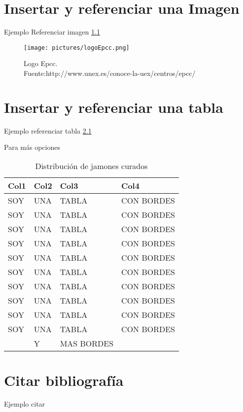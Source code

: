 \documentclass[12pt,a4paper,twoside]{article} %
\begin{document}
\chapter{\textbf{Insertar y referenciar una Imagen\\}}
Ejemplo Referenciar imagen \ref{fig:logoEpcc}
\begin{figure}[H]
\centering
\texttt{[image: pictures/logoEpcc.png]}
\caption[Logo Epcc]{Logo Epcc.\\Fuente:http://www.unex.es/conoce-la-uex/centros/epcc/}
\label{fig:logoEpcc}
\end{figure}

\pagebreak
{}
\chapter{\textbf{Insertar y referenciar una tabla\\}}
Ejemplo referenciar tabla \ref{tab:tablaEj}

Para más opciones \cite{tables} \par
\begin{table}[H]
\centering
\begin{tabular}{|l|l|l|l|}
\hline
 Col1 & Col2 & Col3  & Col4 \\ \hline
SOY &  UNA & TABLA & CON BORDES \\
SOY &  UNA & TABLA & CON BORDES \\
SOY &  UNA & TABLA & CON BORDES \\
SOY &  UNA & TABLA & CON BORDES \\
SOY &  UNA & TABLA & CON BORDES \\
SOY &  UNA & TABLA & CON BORDES \\
SOY &  UNA & TABLA & CON BORDES \\
SOY &  UNA & TABLA & CON BORDES \\
SOY &  UNA & TABLA & CON BORDES \\
SOY &  UNA & TABLA & CON BORDES \\ \hline
 & Y & MAS BORDES & \\
\hline
\end{tabular}
\caption[table]{Distribución de jamones curados}
\label{tab:tablaEj}
\end{table} 


\chapter{\textbf{Citar bibliografía\\}}

Ejemplo citar \cite{haut2016cloud}

\pagebreak
\thispagestyle{empty}
\pagestyle{empty}

%

\end{document}
